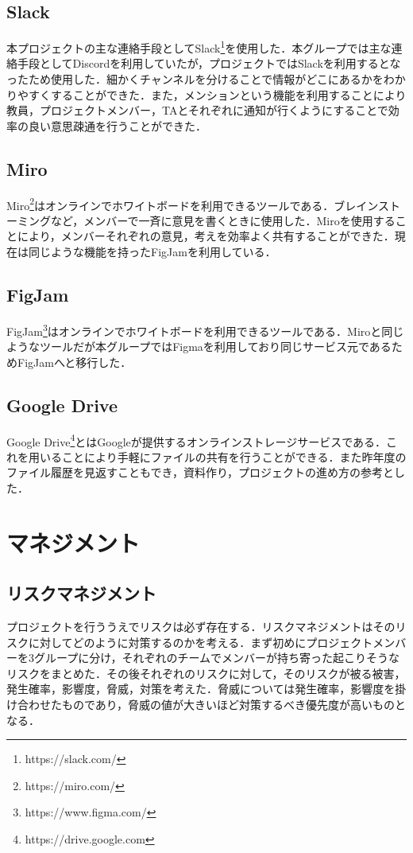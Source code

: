 \documentclass[openany,11pt,papersize,dvipdfm]{jsbook}
\begin{document}
\begin{appendix}
\subsection{Slack}
本プロジェクトの主な連絡手段としてSlack\footnote{https://slack.com/}を使用した．本グループでは主な連絡手段としてDiscordを利用していたが，プロジェクトではSlackを利用するとなったため使用した．細かくチャンネルを分けることで情報がどこにあるかをわかりやすくすることができた．また，メンションという機能を利用することにより教員，プロジェクトメンバー，TAとそれぞれに通知が行くようにすることで効率の良い意思疎通を行うことができた．

\subsection{Miro}
Miro\footnote{https://miro.com/}はオンラインでホワイトボードを利用できるツールである．ブレインストーミングなど，メンバーで一斉に意見を書くときに使用した．Miroを使用することにより，メンバーそれぞれの意見，考えを効率よく共有することができた．現在は同じような機能を持ったFigJamを利用している．

\subsection{FigJam}
FigJam\footnote{https://www.figma.com/}はオンラインでホワイトボードを利用できるツールである．Miroと同じようなツールだが本グループではFigmaを利用しており同じサービス元であるためFigJamへと移行した．

\subsection{Google Drive}
Google Drive\footnote{https://drive.google.com}とはGoogleが提供するオンラインストレージサービスである．これを用いることにより手軽にファイルの共有を行うことができる．また昨年度のファイル履歴を見返すこともでき，資料作り，プロジェクトの進め方の参考とした．
\pagebreak
\section{マネジメント}
\subsection{リスクマネジメント}
プロジェクトを行ううえでリスクは必ず存在する．リスクマネジメント\cite{risk}はそのリスクに対してどのように対策するのかを考える．まず初めにプロジェクトメンバーを3グループに分け，それぞれのチームでメンバーが持ち寄った起こりそうなリスクをまとめた．その後それぞれのリスクに対して，そのリスクが被る被害，発生確率，影響度，脅威，対策を考えた．脅威については発生確率，影響度を掛け合わせたものであり，脅威の値が大きいほど対策するべき優先度が高いものとなる．


\end{appendix}
\end{document}
